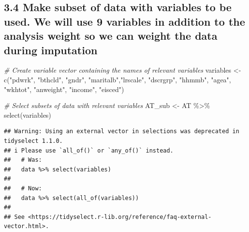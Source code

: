 \documentclass[
]{article}
\newenvironment{Shaded}{\begin{snugshade}}{\end{snugshade}}
\newcommand{\CommentTok}[1]{\textcolor[rgb]{0.56,0.35,0.01}{\textit{#1}}}
\newcommand{\FunctionTok}[1]{\textcolor[rgb]{0.00,0.00,0.00}{#1}}
\newcommand{\NormalTok}[1]{#1}
\newcommand{\OtherTok}[1]{\textcolor[rgb]{0.56,0.35,0.01}{#1}}
\newcommand{\SpecialCharTok}[1]{\textcolor[rgb]{0.00,0.00,0.00}{#1}}
\newcommand{\StringTok}[1]{\textcolor[rgb]{0.31,0.60,0.02}{#1}}
\begin{document}
\begin{Shaded}
\end{Shaded}

\hypertarget{make-subset-of-data-with-variables-to-be-used.-we-will-use-9-variables-in-addition-to-the-analysis-weight-so-we-can-weight-the-data-during-imputation}{%
\subsection{3.4 Make subset of data with variables to be used. We will
use 9 variables in addition to the analysis weight so we can weight the
data during
imputation}\label{make-subset-of-data-with-variables-to-be-used.-we-will-use-9-variables-in-addition-to-the-analysis-weight-so-we-can-weight-the-data-during-imputation}}

\begin{Shaded}
\begin{Highlighting}[]
\CommentTok{\# Create variable vector containing the names of relevant variables}
\NormalTok{variables }\OtherTok{\textless{}{-}} \FunctionTok{c}\NormalTok{(}\StringTok{"pdwrk"}\NormalTok{, }\StringTok{"bthcld"}\NormalTok{, }\StringTok{"gndr"}\NormalTok{, }\StringTok{"maritalb"}\NormalTok{,}\StringTok{"lrscale"}\NormalTok{, }\StringTok{"dscrgrp"}\NormalTok{,}
               \StringTok{"hhmmb"}\NormalTok{, }\StringTok{"agea"}\NormalTok{, }\StringTok{"wkhtot"}\NormalTok{, }\StringTok{"anweight"}\NormalTok{, }\StringTok{"income"}\NormalTok{, }\StringTok{"eisced"}\NormalTok{)}

\CommentTok{\# Select subsets of data with relevant variables}
\NormalTok{AT\_sub }\OtherTok{\textless{}{-}}\NormalTok{ AT }\SpecialCharTok{\%\textgreater{}\%} \FunctionTok{select}\NormalTok{(variables)}
\end{Highlighting}
\end{Shaded}

\begin{verbatim}
## Warning: Using an external vector in selections was deprecated in tidyselect 1.1.0.
## i Please use `all_of()` or `any_of()` instead.
##   # Was:
##   data %>% select(variables)
## 
##   # Now:
##   data %>% select(all_of(variables))
## 
## See <https://tidyselect.r-lib.org/reference/faq-external-vector.html>.
\end{verbatim}
\end{document}
